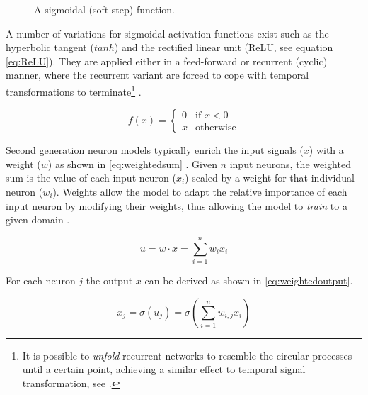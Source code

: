 \documentclass[report.tex]{subfiles}
\begin{document}
\begin{figure}
\centering
{}
\caption{A sigmoidal (soft step) function.}
\label{fig:sigmoid}
\end{figure}

A number of variations for sigmoidal activation functions exist such as the 
hyperbolic tangent ($tanh$) and
the rectified linear unit  (ReLU, see equation \ref{eq:ReLU}). 
They are applied either in a feed-forward or recurrent (cyclic) manner, where
the recurrent variant are forced to cope with temporal transformations to
terminate\footnote{It is possible to \textit{unfold} recurrent
networks to resemble the circular processes until a certain point, achieving
a similar effect to temporal signal transformation, see \cite{Mozer1995}.}
\cite{Schmidhuber2014}.

\begin{equation} \label{eq:ReLU}
f(x) = \begin{cases}
         0 & \text{if } x < 0 \\
	 x & \text{otherwise}
       \end{cases}
\end{equation}

Second generation neuron models typically enrich the
input signals ($x$) with a weight ($w$) as shown in \ref{eq:weightedsum}
\cite{Schmidhuber2014, Russel2007}. 
Given $n$ input neurons, the weighted sum is the value of each
input neuron ($x_i$) scaled by a weight for that individual neuron ($w_i$).
Weights allow the model to adapt the relative importance of each
input neuron by modifying their weights, thus allowing the
model to \textit{train} to a given domain \cite{Schmidhuber2014, Russel2007}.

\begin{equation} \label{eq:weightedsum}
u = w \cdot x = \sum_{i=1}^n w_i x_i
\end{equation}

For each neuron $j$ the output $x$ can be derived as shown in 
\ref{eq:weightedoutput}.

\begin{equation} \label{eq:weightedoutput}
  x_j = \sigma(u_j) = \sigma(\sum_{i=1}^n w_{i,j} x_i)
\end{equation}
\end{document}
